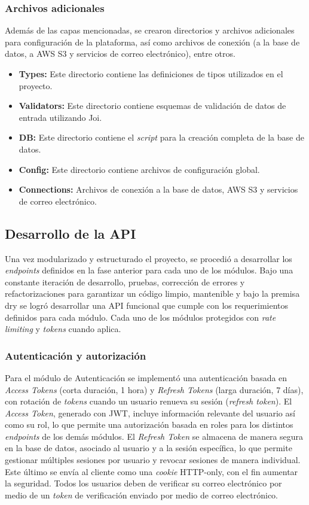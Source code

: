 \subsubsection{Archivos adicionales}
Además de las capas mencionadas, se crearon directorios y archivos adicionales para configuración de la plataforma, así como
archivos de conexión (a la base de datos, a AWS S3 y servicios de correo electrónico), entre otros.
\begin{itemize}
    \item \textbf{Types:} Este directorio contiene las definiciones de tipos utilizados en el proyecto.
    \item \textbf{Validators:} Este directorio contiene esquemas de validación de datos de entrada utilizando Joi.
    \item \textbf{DB:} Este directorio contiene el \textit{\gls{script}} para la creación completa de la base de datos.
    \item \textbf{Config:} Este directorio contiene archivos de configuración global.
    \item \textbf{Connections:} Archivos de conexión a la base de datos, AWS S3 y servicios de correo electrónico.
\end{itemize}

\subsection{Desarrollo de la API}
Una vez modularizado y estructurado el proyecto, se procedió a desarrollar los \textit{endpoints} definidos en la fase anterior para
cada uno de los módulos. Bajo una constante iteración de desarrollo, pruebas, corrección de errores y refactorizaciones para garantizar
un código limpio, mantenible y bajo la premisa \gls{dry} se logró desarrollar una API funcional que cumple con los requerimientos
definidos para cada módulo. Cada uno de los módulos protegidos con \textit{rate limiting} y \textit{tokens} cuando aplica.

\subsubsection{Autenticación y autorización}
Para el módulo de Autenticación se implementó una autenticación basada en \textit{Access Tokens} (corta duración, 1 hora)
y \textit{Refresh Tokens}
(larga duración, 7 días), con rotación de \textit{tokens} cuando un usuario renueva su sesión (\textit{refresh token}).
El \textit{Access Token}, generado con JWT, incluye información relevante del usuario así como su rol, lo que permite una autorización
basada en roles para los distintos \textit{endpoints} de los demás módulos. El \textit{Refresh Token} se almacena de manera segura
en la base de datos, asociado al usuario y a la sesión específica, lo que permite gestionar múltiples sesiones por usuario y
revocar sesiones de manera individual. Este último se envía al cliente como una \textit{cookie} HTTP-only, con el fin aumentar la
seguridad. Todos los usuarios deben de verificar su correo electrónico por medio de un \textit{token} de verificación enviado por
medio de correo electrónico.

